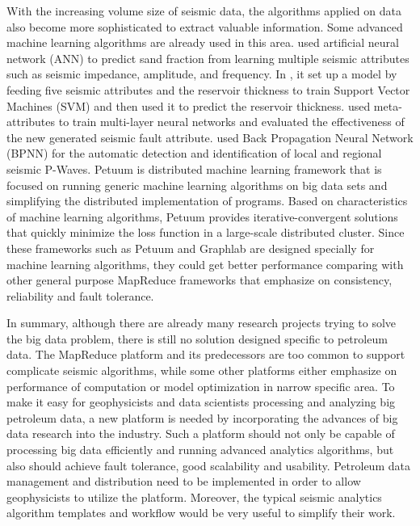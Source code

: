 With the increasing volume size of seismic data, the algorithms applied on data also become more sophisticated to extract valuable information. Some advanced machine learning algorithms are already used in this area. \cite{7067356ChakiPredictSandNeuralNetwork} used artificial neural network (ANN) to predict sand fraction from learning multiple seismic attributes such as seismic impedance, amplitude, and frequency. In \cite{6234749DengSVMPredictReservoir}, it set up a model by feeding five seismic attributes and the reservoir thickness to train Support Vector Machines (SVM) and then used it to predict the reservoir thickness. \cite{4026836MachadoNerualNetworksFault} used meta-attributes to train multi-layer neural networks and evaluated the effectiveness of the new generated seismic fault attribute. \cite{6707117KaurPWaveANN} used Back Propagation Neural Network (BPNN) for the automatic detection and identification of local and regional seismic P-Waves. 
Petuum \cite{Dai2013Petuum} is distributed machine learning framework that is focused on running generic machine learning algorithms on big data sets and simplifying the distributed implementation of programs. Based on characteristics of machine learning algorithms, Petuum provides iterative-convergent solutions that quickly minimize the loss function in a large-scale distributed cluster. Since these frameworks such as Petuum and Graphlab \cite{DatoGraphLab} are designed specially for machine learning algorithms, they could get better performance comparing with other general purpose MapReduce frameworks that emphasize on consistency, reliability and fault tolerance. 

In summary, although there are already many research projects trying to solve the big data problem, there is still no solution designed specific to petroleum data. The MapReduce platform and its predecessors are too common to support complicate seismic algorithms, while some other platforms either emphasize on performance of computation or model optimization in narrow specific area.
To make it easy for geophysicists and data scientists processing and analyzing big petroleum data, a new platform is needed by incorporating the advances of big data research into the industry. Such a platform should not only be capable of processing big data efficiently and running advanced analytics algorithms, but also should achieve fault tolerance, good scalability and usability. Petroleum data management and distribution need to be implemented in order to allow geophysicists to utilize the platform. Moreover, the typical seismic analytics algorithm templates and workflow would be very useful to simplify their work. 


